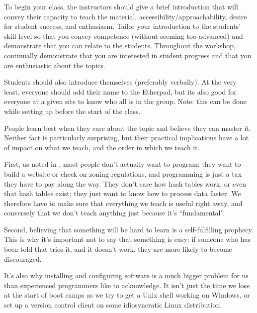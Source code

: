 

To begin your class, the instructors should give a brief introduction
that will convey their capacity to teach the material,
accessibility/approachability, desire for student success, and
enthusiasm. Tailor your introduction to the students' skill level so
that you convey competence (without seeming too advanced) and
demonstrate that you can relate to the students. Throughout the
workshop, continually demonstrate that you are interested in student
progress and that you are enthusiastic about the topics.

Students should also introduce themselves (preferably verbally). At the
very least, everyone should add their name to the Etherpad, but its also
good for everyone at a given site to know who all is in the group. Note:
this can be done while setting up before the start of the class.


People learn best when they care about the topic and believe they can
master it. Neither fact is particularly surprising, but their
practical implications have a lot of impact on what we teach, and the
order in which we teach it.

First, as noted in , most people don't
actually want to program: they want to build a website or check on
zoning regulations, and programming is just a tax they have to pay
along the way. They don't care how hash tables work, or even that hash
tables exist; they just want to know how to process data faster. We
therefore have to make sure that everything we teach is useful right
away, and conversely that we don't teach anything just because it's
``fundamental''.

Second, believing that something will be hard to learn is a
self-fulfilling prophecy. This is why it's important not to say that
something is easy: if someone who has been told that tries it, and it
doesn't work, they are more likely to become discouraged.

It's also why installing and configuring software is a much bigger
problem for us than experienced programmers like to acknowledge. It
isn't just the time we lose at the start of boot camps as we try to
get a Unix shell working on Windows, or set up a version control
client on some idiosyncratic Linux distribution.

